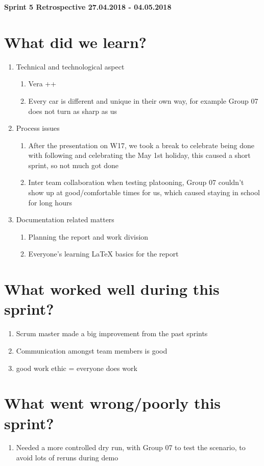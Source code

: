 \documentclass[11pt]{article}
\begin{document}
\textbf{\LARGE Sprint 5 Retrospective 27.04.2018 - 04.05.2018}

\section*{What did we learn?}
\begin{enumerate}
	\item Technical and technological aspect
		\begin{enumerate} 
			\item Vera ++
			\item Every car is different and unique in their own way, for example Group 07 does not turn as sharp as us
		\end{enumerate} 
	\item Process issues
		\begin{enumerate} 
			\item After the presentation on W17, we took a break to celebrate being done with following and celebrating the May 1st holiday, this caused a short sprint, so not much got done
			\item Inter team collaboration when testing platooning, Group 07 couldn’t show up at good/comfortable times for us, which caused staying in school for long hours
		\end{enumerate}		
	\item Documentation related matters
		\begin{enumerate} 
			\item Planning the report and work division
			\item Everyone's learning LaTeX basics for the report
		\end{enumerate}	
\end{enumerate} 

\section*{What worked well during this sprint?}
\begin{enumerate}
	\item Scrum master made a big improvement from the past sprints
	\item Communication amongst team members is good
	\item good work ethic = everyone does work
\end{enumerate} 

\section*{What went wrong/poorly this sprint?}
\begin{enumerate}
	\item Needed a more controlled dry run, with Group 07 to test the scenario, to avoid lots of reruns during demo
\end{enumerate} 
\end{document}
